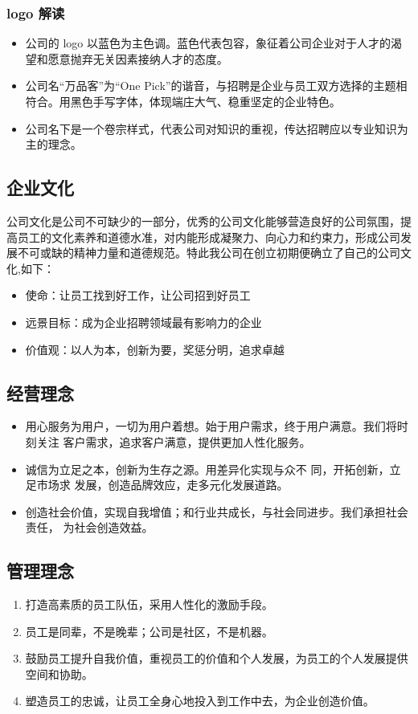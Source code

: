 \documentclass[UTF8]{ctexart}
\begin{document}
\subsubsection{logo 解读}
\begin{itemize}
	\item{公司的 logo 以蓝色为主色调。蓝色代表包容，象征着公司企业对于人才的渴望和愿意抛弃无关因素接纳人才的态度。}
	\item{公司名“万品客”为“One Pick”的谐音，与招聘是企业与员工双方选择的主题相符合。用黑色手写字体，体现端庄大气、稳重坚定的企业特色。}
	\item{公司名下是一个卷宗样式，代表公司对知识的重视，传达招聘应以专业知识为主的理念。}
\end{itemize}
\subsection{企业文化}

公司文化是公司不可缺少的一部分，优秀的公司文化能够营造良好的公司氛围，提高员工的文化素养和道德水准，对内能形成凝聚力、向心力和约束力，形成公司发展不可或缺的精神力量和道德规范。特此我公司在创立初期便确立了自己的公司文化,如下：
\begin{itemize}
	\item 使命：让员工找到好工作，让公司招到好员工
	\item 远景目标：成为企业招聘领域最有影响力的企业
	\item 价值观：以人为本，创新为要，奖惩分明，追求卓越
\end{itemize}
\subsection{经营理念}
\begin{itemize}
	\item 用心服务为用户，一切为用户着想。始于用户需求，终于用户满意。我们将时刻关注 客户需求，追求客户满意，提供更加人性化服务。
	\item 诚信为立足之本，创新为生存之源。用差异化实现与众不   同，开拓创新，立足市场求 发展，创造品牌效应，走多元化发展道路。
	\item 创造社会价值，实现自我增值；和行业共成长，与社会同进步。我们承担社会责任， 为社会创造效益。
\end{itemize}
\subsection{管理理念}

\begin{enumerate}[1.]
	\item 打造高素质的员工队伍，采用人性化的激励手段。
	\item 员工是同辈，不是晚辈；公司是社区，不是机器。
	\item 鼓励员工提升自我价值，重视员工的价值和个人发展，为员工的个人发展提供空间和协助。
	\item 塑造员工的忠诚，让员工全身心地投入到工作中去，为企业创造价值。
\end{enumerate}
\end{document}
